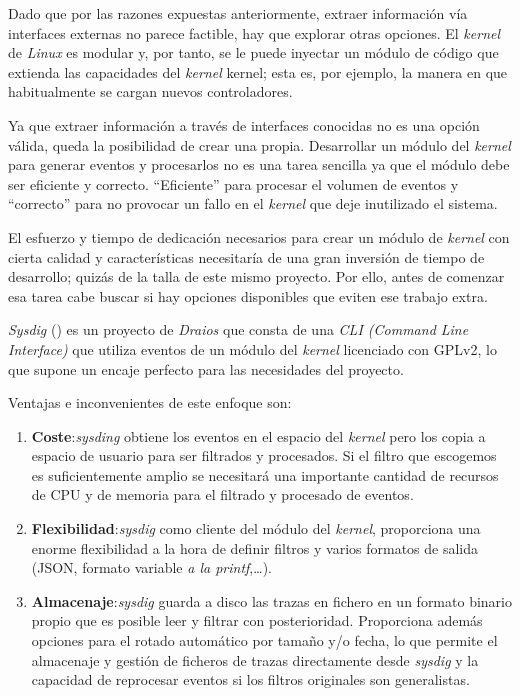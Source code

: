 Dado que por las razones expuestas anteriormente, extraer información vía interfaces externas no parece factible, hay que explorar otras opciones.
El \emph{kernel} de \emph{Linux} es modular y, por tanto, se le puede inyectar un módulo de código que extienda las capacidades del \emph{kernel} kernel; esta es, por ejemplo, la manera
en que habitualmente se cargan nuevos controladores.

Ya que extraer información a través de interfaces conocidas no es una opción válida, queda la posibilidad de crear una propia. 
Desarrollar un módulo del \emph{kernel} para generar eventos y procesarlos no es una tarea sencilla ya que el módulo debe ser eficiente y correcto. ``Eficiente'' para procesar el volumen
de eventos y ``correcto'' para no provocar un fallo en el \emph{kernel} que deje inutilizado el sistema.

El esfuerzo y tiempo de dedicación necesarios para crear un módulo de \emph{kernel} con cierta calidad y características necesitaría de una gran inversión de tiempo de desarrollo; quizás de la talla
de este mismo proyecto. Por ello, antes de comenzar esa tarea cabe buscar si hay opciones disponibles que eviten ese trabajo extra.

\emph{Sysdig} (\cite{sysdig-project}) es un proyecto de \emph{Draios} que consta de una \emph{CLI (Command Line Interface)} que utiliza eventos de un módulo del \emph{kernel}
licenciado con GPLv2, lo que supone un encaje perfecto para las necesidades del proyecto.

Ventajas e inconvenientes de este enfoque son:

\begin{enumerate}
    \item \textbf{Coste}:\emph{sysding} obtiene los eventos en el espacio del \emph{kernel} pero los copia a espacio de usuario para ser
    filtrados y procesados. Si el filtro que escogemos es suficientemente amplio se necesitará una importante cantidad de recursos de CPU y de memoria para el filtrado y procesado de eventos.
    \item \textbf{Flexibilidad}:\emph{sysdig} como cliente del módulo del \emph{kernel}, proporciona una enorme flexibilidad a la hora de definir filtros y varios formatos de salida (JSON, formato variable \emph{a la printf},\ldots).
    \item \textbf{Almacenaje}:\emph{sysdig} guarda a disco las trazas en fichero en un formato binario propio que es posible leer y filtrar con posterioridad. Proporciona además opciones para el rotado automático por tamaño y/o fecha,
    lo que permite el almacenaje y gestión de ficheros de trazas directamente desde \emph{sysdig} y la capacidad de reprocesar eventos si los filtros originales son generalistas. 
\end{enumerate}

